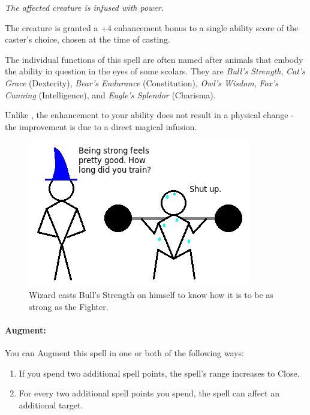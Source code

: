 \emph{The affected creature is infused with power.} 

The creature is granted a +4 enhancement bonus to a single ability score of the caster's choice, chosen at the time of casting. 

The individual functions of this spell are often named after animals that embody the ability in question in the
eyes of some scolars. They are \emph{Bull's Strength}, \emph{Cat's Grace} (Dexterity),
\emph{Bear's Endurance} (Constitution), \emph{Owl's Wisdom}, 
\emph{Fox's Cunning} (Intelligence), and \emph{Eagle's Splendor} (Charisma).

Unlike , the enhancement to your ability does not result in a physical change -
the improvement is due to a direct magical infusion.

\begin{figure}
  \caption{Wizard casts Bull's Strength on himself to know how it is to be as strong as the Fighter.}
  \centering
    \includegraphics{Pics/Wombat.png}
\end{figure}

\paragraph{Augment:} You can Augment this spell in one or both of the following ways:
\begin{enumerate}
 \item If you spend two additional spell points, the spell's range increases to Close.
 \item For every two additional spell points you spend, the spell can affect an additional target.
\end{enumerate}
